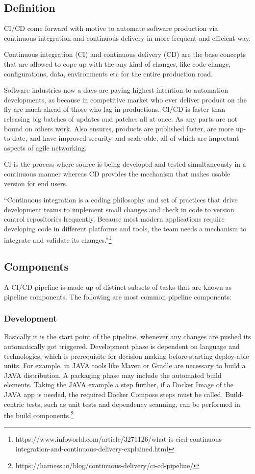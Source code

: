 \subsection{Definition}
%
CI/CD come forward with  motive to automate software production via continuous integration and continuous delivery in more frequent and efficient way.

Continuous integration (CI) and continuous delivery (CD) are the base concepts that are allowed to cope up with the any kind of changes, like code change, configurations, data, environments etc for the entire production road\cite{CD}.

Software industries now a days are paying highest intention to automation developments, as because in competitive market who ever deliver product on the fly are much ahead of those who lag in productions. CI/CD is faster than releasing big batches of updates and patches all at once. As any parts are not bound on others work. Also ensures, products are published faster, are more up-to-date, and have improved security and scale able, all of which are important aspects of agile networking.

CI is the process where source is being developed and tested simultaneously in a continuous manner whereas CD provides the mechanism that makes usable version for end users\cite{CDHandsOn}.

“Continuous integration is a coding philosophy and set of practices that drive development teams to implement small changes and check in code to version control repositories frequently. Because most modern applications require developing code in different platforms and tools, the team needs a mechanism to integrate and validate its changes.”\footnote{https://www.infoworld.com/article/3271126/what-is-cicd-continuous-integration-and-continuous-delivery-explained.html}

%
\subsection{Components}
%
A CI/CD pipeline is made up of distinct subsets of tasks that are known as pipeline components. The following are most common pipeline components:

\subsubsection{Development}

Basically it is the start point of the pipeline, whenever any changes are pushed its automatically got triggered. Development phase is dependent on language and technologies, which is prerequisite for decision making before starting deploy-able units. For example, in JAVA tools like Maven or Gradle are necessary to build a JAVA distribution. A packaging phase may include the automated build elements. Taking the JAVA example a step further, if a Docker Image of the JAVA app is needed, the required Docker Compose steps must be called. Build-centric tests, such as unit tests and dependency scanning, can be performed in the build components.\footnote{https://harness.io/blog/continuous-delivery/ci-cd-pipeline/}


